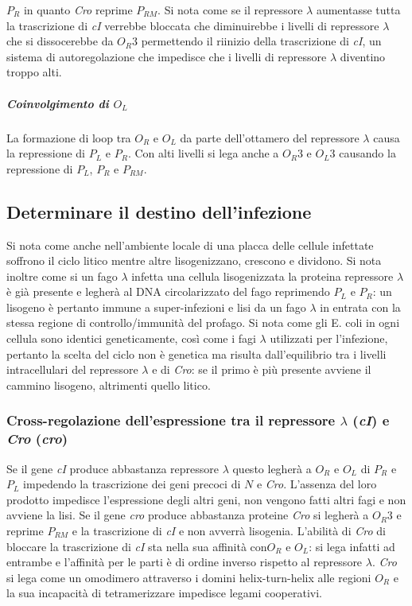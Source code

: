 $P_R$ in quanto \emph{Cro} reprime $P_{RM}$. Si nota come se il repressore $\lambda$ aumentasse tutta la trascrizione di \emph{cI} verrebbe bloccata che diminuirebbe i livelli di 
repressore $\lambda$ che si dissocerebbe da $O_R3$ permettendo il riinizio della trascrizione di \emph{cI}, un sistema di autoregolazione che impedisce che i livelli di repressore 
$\lambda$ diventino troppo alti. 
\subparagraph{Coinvolgimento di $O_L$}
La formazione di loop tra $O_R$ e $O_L$ da parte dell'ottamero del repressore $\lambda$ causa la repressione di $P_L$ e $P_R$. Con alti livelli si lega anche a $O_R3$ e $O_L3$ causando
la repressione di $P_L$, $P_R$ e $P_{RM}$.
\subsection{Determinare il destino dell'infezione}
Si nota come anche nell'ambiente locale di una placca delle cellule infettate soffrono il ciclo litico mentre altre lisogenizzano, crescono e dividono. Si nota inoltre come si un 
fago $\lambda$ infetta una cellula lisogenizzata la proteina repressore $\lambda$ \`e gi\`a presente e legher\`a al DNA circolarizzato del fago reprimendo $P_L$ e $P_R$: un lisogeno 
\`e pertanto immune a super-infezioni e lisi da un fago $\lambda$ in entrata con la stessa regione di controllo/immunit\`a del profago. Si nota come gli E. coli in ogni cellula sono
identici geneticamente, cos\`i come i fagi $\lambda$ utilizzati per l'infezione, pertanto la scelta del ciclo non \`e genetica ma risulta dall'equilibrio tra i livelli intracellulari 
del repressore $\lambda$ e di \emph{Cro}: se il primo \`e pi\`u presente avviene il cammino lisogeno, altrimenti quello litico.
\subsubsection{Cross-regolazione dell'espressione tra il repressore $\lambda$ (\emph{cI}) e \emph{Cro} (\emph{cro})}
Se il gene \emph{cI} produce abbastanza repressore $\lambda$ questo legher\`a a $O_R$ e $O_L$ di $P_R$ e $P_L$ impedendo la trascrizione dei geni precoci di $N$ e \emph{Cro}. L'assenza
del loro prodotto impedisce l'espressione degli altri geni, non vengono fatti altri fagi e non avviene la lisi. Se il gene \emph{cro} produce abbastanza proteine \emph{Cro} si 
legher\`a a $O_R3$ e reprime $P_{RM}$ e la trascrizione di \emph{cI} e non avverr\`a lisogenia. L'abilit\`a di \emph{Cro} di bloccare la trascrizione di \emph{cI} sta nella sua 
affinit\`a con$O_R$ e $O_L$: si lega infatti ad entrambe e l'affinit\`a per le parti \`e di ordine inverso rispetto al repressore $\lambda$. \emph{Cro} si lega come un omodimero 
attraverso i domini helix-turn-helix alle regioni $O_R$ e la sua incapacit\`a di tetramerizzare impedisce legami cooperativi. 

